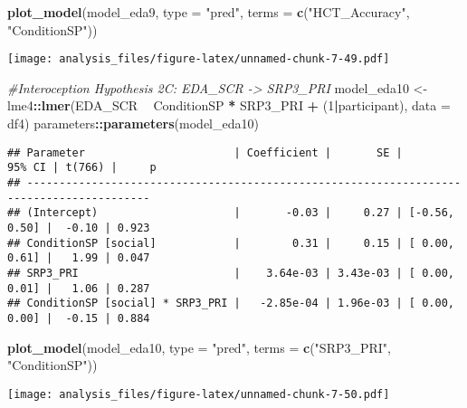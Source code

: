 \documentclass[
]{article}
\newenvironment{Shaded}{\begin{snugshade}}{\end{snugshade}}
\newcommand{\CommentTok}[1]{\textcolor[rgb]{0.56,0.35,0.01}{\textit{#1}}}
\newcommand{\DataTypeTok}[1]{\textcolor[rgb]{0.13,0.29,0.53}{#1}}
\newcommand{\DecValTok}[1]{\textcolor[rgb]{0.00,0.00,0.81}{#1}}
\newcommand{\KeywordTok}[1]{\textcolor[rgb]{0.13,0.29,0.53}{\textbf{#1}}}
\newcommand{\NormalTok}[1]{#1}
\newcommand{\OperatorTok}[1]{\textcolor[rgb]{0.81,0.36,0.00}{\textbf{#1}}}
\newcommand{\StringTok}[1]{\textcolor[rgb]{0.31,0.60,0.02}{#1}}
\begin{document}
\begin{Shaded}
\begin{Highlighting}[]
\KeywordTok{plot_model}\NormalTok{(model_eda9, }\DataTypeTok{type =} \StringTok{"pred"}\NormalTok{, }\DataTypeTok{terms =} \KeywordTok{c}\NormalTok{(}\StringTok{"HCT_Accuracy"}\NormalTok{, }\StringTok{"ConditionSP"}\NormalTok{))}
\end{Highlighting}
\end{Shaded}

\texttt{[image: analysis\_files/figure-latex/unnamed-chunk-7-49.pdf]}

\begin{Shaded}
\begin{Highlighting}[]
\CommentTok{#Interoception Hypothesis 2C: EDA_SCR -> SRP3_PRI}
\NormalTok{model_eda10 <-}\StringTok{ }\NormalTok{lme4}\OperatorTok{::}\KeywordTok{lmer}\NormalTok{(EDA_SCR }\OperatorTok{~}\StringTok{ }\NormalTok{ConditionSP }\OperatorTok{*}\StringTok{ }\NormalTok{SRP3_PRI }\OperatorTok{+}\StringTok{ }\NormalTok{(}\DecValTok{1}\OperatorTok{|}\NormalTok{participant), }\DataTypeTok{data =}\NormalTok{ df4)}
\NormalTok{parameters}\OperatorTok{::}\KeywordTok{parameters}\NormalTok{(model_eda10)}
\end{Highlighting}
\end{Shaded}

\begin{verbatim}
## Parameter                       | Coefficient |       SE |        95% CI | t(766) |     p
## -----------------------------------------------------------------------------------------
## (Intercept)                     |       -0.03 |     0.27 | [-0.56, 0.50] |  -0.10 | 0.923
## ConditionSP [social]            |        0.31 |     0.15 | [ 0.00, 0.61] |   1.99 | 0.047
## SRP3_PRI                        |    3.64e-03 | 3.43e-03 | [ 0.00, 0.01] |   1.06 | 0.287
## ConditionSP [social] * SRP3_PRI |   -2.85e-04 | 1.96e-03 | [ 0.00, 0.00] |  -0.15 | 0.884
\end{verbatim}

\begin{Shaded}
\begin{Highlighting}[]
\KeywordTok{plot_model}\NormalTok{(model_eda10, }\DataTypeTok{type =} \StringTok{"pred"}\NormalTok{, }\DataTypeTok{terms =} \KeywordTok{c}\NormalTok{(}\StringTok{"SRP3_PRI"}\NormalTok{, }\StringTok{"ConditionSP"}\NormalTok{))}
\end{Highlighting}
\end{Shaded}

\texttt{[image: analysis\_files/figure-latex/unnamed-chunk-7-50.pdf]}
\end{document}
